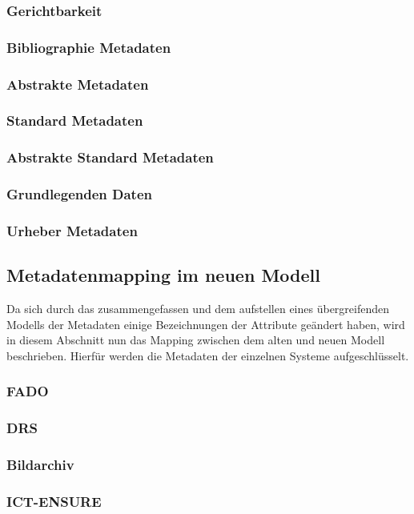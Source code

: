 \subsubsection{Gerichtbarkeit}
\subsubsection{Bibliographie Metadaten}
\subsubsection{Abstrakte Metadaten}
\subsubsection{Standard Metadaten}
\subsubsection{Abstrakte Standard Metadaten}
\subsubsection{Grundlegenden Daten}
\subsubsection{Urheber Metadaten}
\subsection{Metadatenmapping im neuen Modell}
Da sich durch das zusammengefassen und dem aufstellen eines \"ubergreifenden Modells der Metadaten einige Bezeichnungen der Attribute ge\"andert haben, wird in diesem Abschnitt nun das Mapping zwischen dem alten und neuen Modell beschrieben. Hierf\"ur werden die Metadaten der einzelnen Systeme aufgeschl\"usselt.

\subsubsection{FADO}
\subsubsection{DRS}
\subsubsection{Bildarchiv}
\subsubsection{ICT-ENSURE}